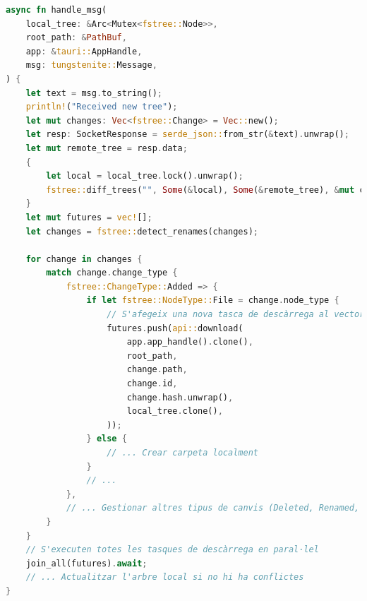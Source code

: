 \begin{lstlisting}[language=rust, caption={Processament de missatges WebSocket a \texttt{synchronizer.rs}}]
async fn handle_msg(
    local_tree: &Arc<Mutex<fstree::Node>>,
    root_path: &PathBuf,
    app: &tauri::AppHandle,
    msg: tungstenite::Message,
) {
    let text = msg.to_string();
    println!("Received new tree");
    let mut changes: Vec<fstree::Change> = Vec::new();
    let resp: SocketResponse = serde_json::from_str(&text).unwrap();
    let mut remote_tree = resp.data;
    {
        let local = local_tree.lock().unwrap();
        fstree::diff_trees("", Some(&local), Some(&remote_tree), &mut changes);
    }
    let mut futures = vec![];
    let changes = fstree::detect_renames(changes);
    
    for change in changes {
        match change.change_type {
            fstree::ChangeType::Added => {
                if let fstree::NodeType::File = change.node_type {
                    // S'afegeix una nova tasca de descàrrega al vector de futures
                    futures.push(api::download(
                        app.app_handle().clone(),
                        root_path,
                        change.path,
                        change.id,
                        change.hash.unwrap(),
                        local_tree.clone(),
                    ));
                } else {
                    // ... Crear carpeta localment
                }
                // ...
            },
            // ... Gestionar altres tipus de canvis (Deleted, Renamed, Modified)
        }
    }
    // S'executen totes les tasques de descàrrega en paral·lel
    join_all(futures).await;
    // ... Actualitzar l'arbre local si no hi ha conflictes
}
\end{lstlisting}

